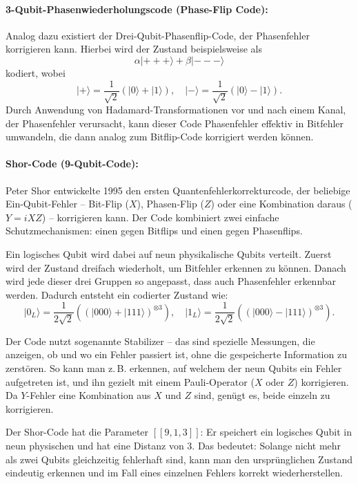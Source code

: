\paragraph{3-Qubit-Phasenwiederholungscode (Phase-Flip Code):}
Analog dazu existiert der Drei-Qubit-Phasenflip-Code, der Phasenfehler korrigieren kann. Hierbei wird der Zustand beispielsweise als
\[
\alpha \lvert{+++}\rangle + \beta \lvert{---}\rangle
\]
kodiert, wobei
\[
\lvert + \rangle = \frac{1}{\sqrt{2}}(\lvert 0 \rangle + \lvert 1 \rangle), \quad
\lvert - \rangle = \frac{1}{\sqrt{2}}(\lvert 0 \rangle - \lvert 1 \rangle).
\]
Durch Anwendung von Hadamard-Transformationen vor und nach einem Kanal, der Phasenfehler verursacht, kann dieser Code Phasenfehler effektiv in Bitfehler umwandeln, die dann analog zum Bitflip-Code korrigiert werden können.
\cite[Seite 430-431]{nielsen_quantum_2010}\\

\paragraph{Shor-Code (9-Qubit-Code):}

Peter Shor entwickelte 1995 den ersten Quantenfehlerkorrekturcode, der beliebige Ein-Qubit-Fehler – Bit-Flip (\(X\)), Phasen-Flip (\(Z\)) oder eine Kombination daraus (\(Y = iXZ\)) – korrigieren kann. Der Code kombiniert zwei einfache Schutzmechanismen: einen gegen Bitflips und einen gegen Phasenflips.

Ein logisches Qubit wird dabei auf neun physikalische Qubits verteilt. Zuerst wird der Zustand dreifach wiederholt, um Bitfehler erkennen zu können. Danach wird jede dieser drei Gruppen so angepasst, dass auch Phasenfehler erkennbar werden. Dadurch entsteht ein codierter Zustand wie:
\[
\lvert 0_L \rangle = \frac{1}{2\sqrt{2}} \left( ( \lvert 000 \rangle + \lvert 111 \rangle )^{\otimes 3} \right),
\quad
\lvert 1_L \rangle = \frac{1}{2\sqrt{2}} \left( ( \lvert 000 \rangle - \lvert 111 \rangle )^{\otimes 3} \right).
\]

Der Code nutzt sogenannte Stabilizer – das sind spezielle Messungen, die anzeigen, ob und wo ein Fehler passiert ist, ohne die gespeicherte Information zu zerstören. So kann man z.\,B. erkennen, auf welchem der neun Qubits ein Fehler aufgetreten ist, und ihn gezielt mit einem Pauli-Operator (\(X\) oder \(Z\)) korrigieren. Da \(Y\)-Fehler eine Kombination aus \(X\) und \(Z\) sind, genügt es, beide einzeln zu korrigieren.

Der Shor-Code hat die Parameter \([[9,1,3]]\): Er speichert ein logisches Qubit in neun physischen und hat eine Distanz von 3. Das bedeutet: Solange nicht mehr als zwei Qubits gleichzeitig fehlerhaft sind, kann man den ursprünglichen Zustand eindeutig erkennen und im Fall eines einzelnen Fehlers korrekt wiederherstellen.


